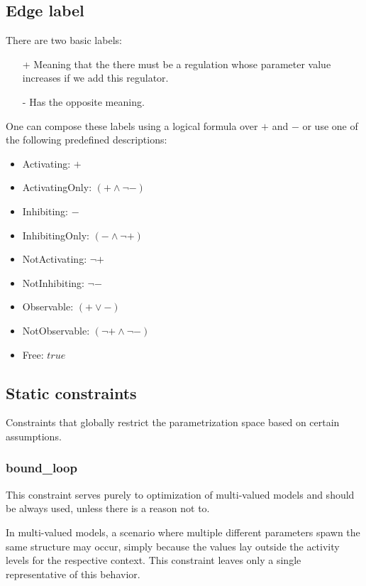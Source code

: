 \documentclass[12pt]{article}
\begin{document}
\subsection{Edge label}
\label{EdgeLabel}
There are two basic labels:
\begin{itemize}
\item [+]	Meaning that the there must be a regulation whose parameter value increases if we add this regulator.
\item [-]	Has the opposite meaning.
\end{itemize}
One can compose these labels using a logical formula over $+$ and $-$ or use one of the following predefined descriptions:
\begin{itemize}
\item Activating: $+$
\item ActivatingOnly: $(+ \wedge \neg -)$
\item Inhibiting: $-$
\item InhibitingOnly: $(- \wedge \neg +)$
\item NotActivating: $\neg +$
\item NotInhibiting: $\neg -$
\item Observable: $(+ \vee -)$
\item NotObservable: $(\neg + \wedge \neg -)$
\item Free: $true$

\end{itemize}

\subsection{Static constraints}
\label{StaticConstraints}
Constraints that globally restrict the parametrization space based on certain assumptions.
\subsubsection*{bound\_loop}
This constraint serves purely to optimization of multi-valued models and should be always used, unless there is a reason not to.

In multi-valued models, a scenario where multiple different parameters spawn the same structure may occur, simply because the values lay outside the activity levels for the respective context. This constraint leaves only a single representative of this behavior.
\end{document}
